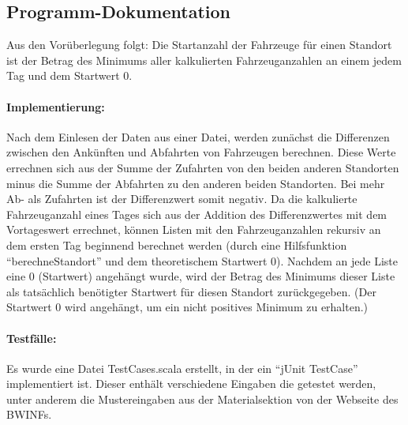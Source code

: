 \subsection{Programm-Dokumentation}
Aus den Vorüberlegung folgt:
Die Startanzahl der Fahrzeuge für einen Standort ist der Betrag des Minimums aller kalkulierten Fahrzeuganzahlen an einem jedem Tag und dem Startwert 0.
\paragraph{Implementierung:} Nach dem Einlesen der Daten aus einer Datei, werden zunächst die Differenzen zwischen den Ankünften und Abfahrten
von Fahrzeugen berechnen. Diese Werte errechnen sich aus der Summe der Zufahrten von den beiden anderen Standorten
minus die Summe der Abfahrten zu den anderen beiden Standorten.
Bei mehr Ab- als Zufahrten ist der Differenzwert somit negativ. 
Da die kalkulierte Fahrzeuganzahl eines Tages sich aus der Addition des Differenzwertes mit dem Vortageswert errechnet, können
Listen mit den Fahrzeuganzahlen rekursiv an dem ersten Tag beginnend berechnet werden
(durch eine Hilfsfunktion ``berechneStandort'' und dem theoretischem Startwert 0).
Nachdem an jede Liste eine 0 (Startwert) angehängt wurde, wird der Betrag des Minimums dieser Liste als tatsächlich benötigter
Startwert für diesen Standort zurückgegeben.
(Der Startwert 0 wird angehängt, um ein nicht positives Minimum zu erhalten.)
\paragraph{Testfälle:} Es wurde eine Datei TestCases.scala erstellt, in der ein ``jUnit TestCase'' implementiert ist.
Dieser enthält verschiedene Eingaben die getestet werden, unter anderem die Mustereingaben aus der Materialsektion von der Webseite des BWINFs.
